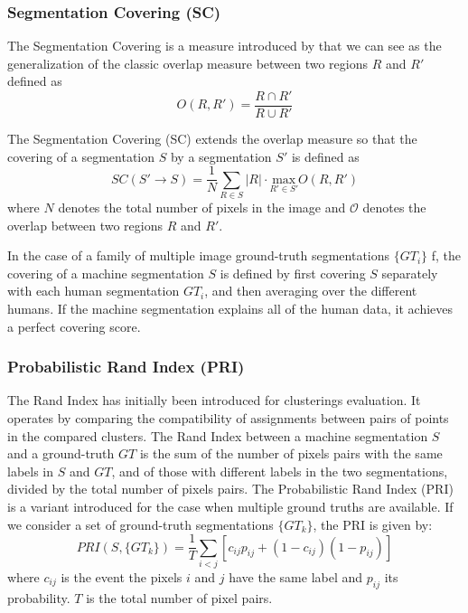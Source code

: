 \subsubsection{Segmentation Covering (SC)}

The Segmentation Covering is a measure introduced by \cite{Arbelaez.Maire.ea:PR:2009} that we can see as the generalization of the classic overlap measure between two regions $R$ and $R'$ defined as
\begin{equation}
	O(R, R') = \frac{R \cap R'}{R \cup R'}
\end{equation}

The Segmentation Covering (SC) extends the overlap measure so that the covering of a segmentation $S$ by a segmentation $S'$ is defined as 
\begin{equation}
	SC(S' \rightarrow S) = \frac{1}{N}\sum_{R \in S} |R| \cdot \underset{R' \in S'}{\mathrm{max}} O(R, R')
\end{equation}
where $N$ denotes the total number of pixels in the image and $\mathcal{O}$ denotes the overlap between two regions $R$ and $R'$.

In the case of a family of multiple image ground-truth segmentations $\{GT_i\}$ f, the covering of a machine segmentation $S$ is defined by first covering $S$ separately with each human segmentation $GT_i$, and then averaging over the different humans. If the machine segmentation explains all of the human data, it achieves a perfect covering score.

\subsubsection{Probabilistic Rand Index (PRI)}
The Rand Index has initially been introduced for clusterings evaluation. It operates by comparing the compatibility of assignments between pairs of points in the compared clusters. The Rand Index between a machine segmentation $S$ and a ground-truth $GT$ is the sum of the number of pixels pairs with the same labels in $S$ and $GT$, and of those with different labels in the two segmentations, divided by the total number of pixels pairs. The Probabilistic Rand Index (PRI) \citep{Unnikrishnan.Pantofaru.ea:CVPR:2005} is a variant introduced for the case when multiple ground truths are available. If we consider a set of ground-truth segmentations $\{GT_k\}$, the PRI is given by:
\begin{equation}
	PRI(S, \{GT_k\}) = \frac{1}{T}\sum_{i<j} [c_{ij}p_{ij} + (1-c_{ij})(1-p_{ij})]
\end{equation}
where $c_{ij}$ is the event the pixels $i$ and $j$ have the same label and $p_{ij}$ its probability. $T$ is the total number of pixel pairs.

